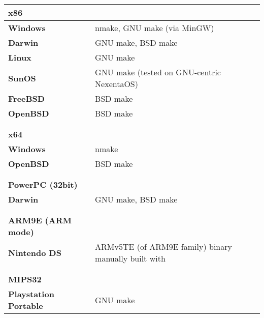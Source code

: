 \begin{tabular}{l l}
{\bf{\large x86}} &                                           \\
\hline\hline
{\bf Windows}     & nmake, GNU make (via MinGW)               \\
{\bf Darwin}      & GNU make, BSD make                        \\
{\bf Linux}       & GNU make                                  \\
{\bf SunOS}       & GNU make (tested on GNU-centric NexentaOS)\\
{\bf FreeBSD}     & BSD make                                  \\
{\bf OpenBSD}     & BSD make                                  \\
\hline
                  &                                           \\
                  &                                           \\


{\bf{\large x64}} &                                           \\
\hline\hline
{\bf Windows}     & nmake                                     \\
{\bf OpenBSD}     & BSD make                                  \\
\hline
                  &                                           \\
                  &                                           \\


{\bf{\large PowerPC (32bit)}} &                               \\
\hline\hline
{\bf Darwin}                  & GNU make, BSD make            \\
\hline
                  &                                           \\
                  &                                           \\


{\bf{\large ARM9E (ARM mode)}} &                             \\
\hline\hline
{\bf Nintendo DS} & ARMv5TE (of ARM9E family) binary manually built with \cite{devkitPro}\\
\hline
                  &                                           \\
                  &                                           \\
		  
{\bf{\large MIPS32}} &              \\
\hline\hline
{\bf Playstation Portable} & GNU make                        \\
\hline

\end{tabular}\\

